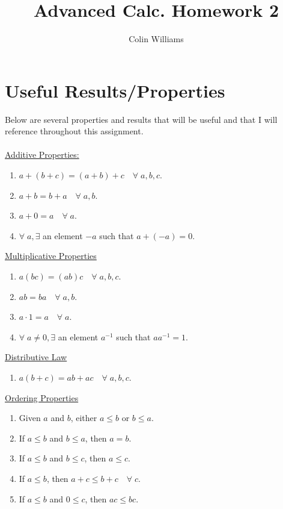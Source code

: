 \documentclass[10pt,a4paper]{article}
\title{Advanced Calc. Homework 2}
\author{Colin Williams}
\theoremstyle{definition}
\begin{document}
\maketitle
\section*{Useful Results/Properties}
Below are several properties and results that will be useful and that I will reference throughout this assignment.
\\
\\\underline{Additive Properties:}
\begin{enumerate}[label = A\arabic*.]
\item $a + (b + c) = (a + b) + c \quad \forall \; a,b,c$.
\item $a + b = b + a \quad \forall \; a,b$.
\item $a + 0 = a \quad \forall \; a$.
\item $\forall \; a, \exists$ an element $-a$ such that $a + (-a) = 0$.
\end{enumerate}
{$ $}\\
\underline{Multiplicative Properties}
\begin{enumerate}[label = M\arabic*.]
\item $a(bc) = (ab)c \quad \forall \; a,b,c$.
\item $ab = ba \quad \forall \; a,b$.
\item $a \cdot 1 = a \quad \forall \; a$.
\item $\forall \; a \neq 0, \exists$ an element $a^{-1}$ such that $aa^{-1} = 1$.
\end{enumerate}
{$ $}\\
\underline{Distributive Law}
\begin{enumerate}[label = DL.]
\item $a(b + c) = ab + ac \quad \forall \; a,b,c$.
\end{enumerate}
{$ $}\\
\underline{Ordering Properties}
\begin{enumerate}[label = O\arabic*.]
\item Given $a$ and $b$, either $a \leq b$ or $b \leq a$.
\item If $a \leq b$ and $b \leq a$, then $a = b$.
\item If $a \leq b$ and $b \leq c$, then $a \leq c$.
\item If $a \leq b$, then $a + c \leq b + c \quad \forall \; c$.
\item If $a \leq b$ and $0 \leq c$, then $ac \leq bc$.
\end{enumerate}
\end{document}
